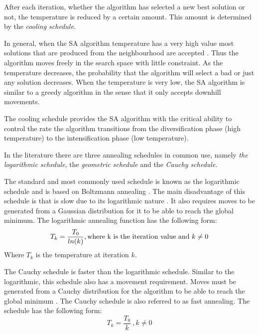 After each iteration, whether the algorithm has selected a new best solution or not, the temperature is reduced by a certain amount. This amount is determined by the \emph{cooling schedule}.

In general, when the \gls{SA} algorithm temperature has a very high value most solutions that are produced from the neighbourhood are accepted \cite{ClusterSA}. Thus the algorithm moves freely in the search space with little constraint. As the temperature decreases, the probability that the algorithm will select a bad or just any solution decreases\cite{ClusterSA}. When the temperature is very low, the \gls{SA} algorithm is similar to a greedy algorithm in the sense that it only accepts downhill movements\cite{ClusterSA}.

The cooling schedule provides the \gls{SA} algorithm with the critical ability to control the rate the algorithm transitions from the diversification phase (high temperature) to the intensification phase (low temperature)\cite{ClusterSA}.

In the literature there are three annealing schedules in common use, namely \emph{the logarithmic schedule}, the \emph{geometric schedule} and the \emph{Cauchy schedule}\cite{VeryFastSAImageEnchancement,SASingleMultiObj}. 

The standard and most commonly used schedule is known as the logarithmic schedule and is based on Boltzmann annealing \cite{VeryFastSAImageEnchancement}. The main disadvantage of this schedule is that is slow due to its logarithmic nature \cite{VeryFastSAImageEnchancement}. It also requires moves to be generated from a Gaussian distribution for it to be able to reach the global minimum\cite{SASingleMultiObj}. The logarithmic annealing function has the following form:
\begin{equation}
\label{eq:logcooling}
	T_k = \frac{T_0}{ln(k)},\text{where k is the iteration value and } k \neq 0\\
\end{equation}
Where $T_k$ is the temperature at iteration $k$.

The Cauchy schedule is faster than the logarithmic schedule. Similar to the logarithmic, this schedule also has a movement requirement. Moves must be generated from a Cauchy distribution for the algorithm to be able to reach the global minimum \cite{SASingleMultiObj,VeryFastSAImageEnchancement}. The Cauchy schedule is also referred to as fast annealing\cite{VeryFastSAImageEnchancement}. The schedule has the following form:
\begin{equation}
\label{eq:cauchycooling}
	T_k = \frac{T_0}{k} ~, k \neq 0
\end{equation}

